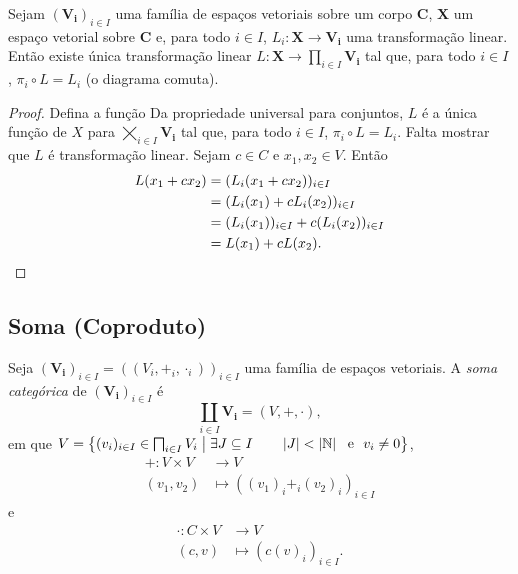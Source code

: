 \begin{prop}
Sejam $(\bm{V_i})_{i \in I}$ uma família de espaços vetoriais sobre um corpo $\bm C$, $\bm X$ um espaço vetorial sobre $\bm C$ e, para todo $i \in I$, $L_i: \bm X \to \bm{V_i}$ uma transformação linear. Então existe única transformação linear $L: \bm X \to \prod_{i \in I} \bm{V_i}$ tal que, para todo $i \in I$, $\pi_i \circ L = L_i$ (o diagrama comuta).
\begin{figure}[!h]
\centering
{}
\end{figure}
\end{prop}
\begin{proof}
Defina a função  Da propriedade universal para conjuntos, $L$ é a única função de $X$ para $\bigtimes_{i \in I} \bm{V_i}$ tal que, para todo $i \in I$, $\pi_i \circ L = L_i$. Falta mostrar que $L$ é transformação linear. Sejam $c \in C$ e $x_1,x_2 \in V$. Então
	\begin{align*}
	L(x_1+cx_2) &= (L_i(x_1+cx_2))_{i \in I} \\
		&= (L_i(x_1)+cL_i(x_2))_{i \in I} \\
		&= (L_i(x_1))_{i \in I}+c(L_i(x_2))_{i \in I} \\
		&= L(x_1)+cL(x_2). \qedhere
	\end{align*}
\end{proof}





\clearpage
\subsection{Soma (Coproduto)}

\begin{defi}
Seja $(\bm{V_i})_{i \in I} = ((V_i,+_i,\cdot_i))_{i \in I}$ uma família de espaços vetoriais. A \emph{soma categórica} de $(\bm{V_i})_{i \in I}$ é
	\begin{equation*}
	\coprod_{i \in I} \bm{V_i} = (V,+,\cdot),
	\end{equation*}
em que $V = \set{(v_i)_{i \in I} \in \prod_{i \in I} V_i}{\exists J \subseteq I \qquad \card{J} < \card{\N} \e v_i \neq 0}$,
	\begin{align*}
	+: V \times V &\to V \\
			(v_1,v_2) &\mapsto ((v_1)_i +_i (v_2)_i)_{i \in I}
	\end{align*}
e
	\begin{align*}
	\cdot: C \times V &\to V \\
			(c,v) &\mapsto (c(v)_i)_{i \in I}.
	\end{align*}
\end{defi}

